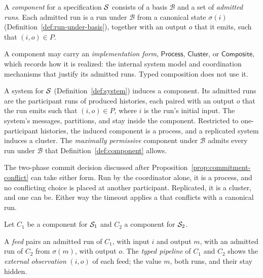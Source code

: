 \begin{definition}
\label{def:component}
A \emph{component} for a specification $\mathcal{S}$ consists of a \commitment basis
$\mathcal B$ and a set of \emph{admitted runs}.  Each admitted run is a run
under $\mathcal B$ from a canonical state $\sigma(i)$
(Definition~\ref{def:run-under-basis}), together with an output $o$ that it
emits, such that $(i,o)\in P$.
\end{definition}

\begin{definition}
\label{def:implementation-form}
A component may carry an \emph{implementation form}, $\mathsf{Process}$,
$\mathsf{Cluster}$, or $\mathsf{Composite}$, which records how it is
realized: the internal system model and coordination mechanisms that justify
its admitted runs.  Typed composition does not use it.
\end{definition}

A system for $\mathcal{S}$ (Definition~\ref{def:system}) induces a component.  Its
admitted runs are the participant runs of produced histories, each paired
with an output $o$ that the run emits such that $(i,o)\in P$, where $i$ is the
run's initial input.  The system's messages, partitions, and \commitments stay
inside the component.  Restricted to one-participant histories, the induced
component is a process, and a replicated system induces a cluster.  The
\emph{maximally permissive} component under $\mathcal B$ admits every run
under $\mathcal B$ that Definition~\ref{def:component} allows.

The two-phase commit decision discussed after
Proposition~\ref{prop:commitment-conflict} can take either form.  Run by the
coordinator alone, it is a process, and no conflicting choice is placed at
another participant.  Replicated, it is a cluster, and one can be.  Either way
the timeout applies a \commitment that conflicts with a canonical run.

Let $C_1$ be a component for $\mathcal{S}_1$ and $C_2$ a component for $\mathcal{S}_2$.

\begin{definition}
\label{def:typed-pipeline}
A \emph{feed} pairs an admitted run of $C_1$, with input $i$ and output $m$,
with an admitted run of $C_2$ from $\sigma(m)$, with output $o$.  The
\emph{typed pipeline} of $C_1$ and $C_2$ shows the \emph{external
observation} $(i,o)$ of each feed; the value $m$, both runs, and their
\commitments stay hidden.
\end{definition}

